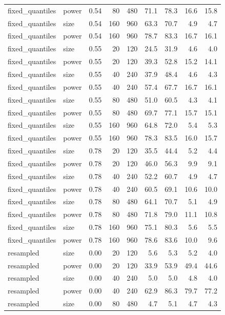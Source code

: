 \begin{table}[p]
\begin{tabular}{@{}llrrrrrrr@{}}
fixed\_quantiles & power & 0.54 & 80 & 480 & 71.1 & 78.3 & 16.6 & 15.8 \\
fixed\_quantiles & size & 0.54 & 160 & 960 & 63.3 & 70.7 & 4.9 & 4.7 \\
fixed\_quantiles & power & 0.54 & 160 & 960 & 78.7 & 83.3 & 16.7 & 16.1 \\
fixed\_quantiles & size & 0.55 & 20 & 120 & 24.5 & 31.9 & 4.6 & 4.0 \\
fixed\_quantiles & power & 0.55 & 20 & 120 & 39.3 & 52.8 & 15.2 & 14.1 \\
fixed\_quantiles & size & 0.55 & 40 & 240 & 37.9 & 48.4 & 4.6 & 4.3 \\
fixed\_quantiles & power & 0.55 & 40 & 240 & 57.4 & 67.7 & 16.7 & 16.1 \\
fixed\_quantiles & size & 0.55 & 80 & 480 & 51.0 & 60.5 & 4.3 & 4.1 \\
fixed\_quantiles & power & 0.55 & 80 & 480 & 69.7 & 77.1 & 15.7 & 15.1 \\
fixed\_quantiles & size & 0.55 & 160 & 960 & 64.8 & 72.0 & 5.4 & 5.3 \\
fixed\_quantiles & power & 0.55 & 160 & 960 & 78.3 & 83.5 & 16.0 & 15.7 \\
fixed\_quantiles & size & 0.78 & 20 & 120 & 35.5 & 44.4 & 5.2 & 4.4 \\
fixed\_quantiles & power & 0.78 & 20 & 120 & 46.0 & 56.3 & 9.9 & 9.1 \\
fixed\_quantiles & size & 0.78 & 40 & 240 & 52.2 & 60.7 & 4.9 & 4.7 \\
fixed\_quantiles & power & 0.78 & 40 & 240 & 60.5 & 69.1 & 10.6 & 10.0 \\
fixed\_quantiles & size & 0.78 & 80 & 480 & 64.1 & 70.7 & 5.1 & 4.9 \\
fixed\_quantiles & power & 0.78 & 80 & 480 & 71.8 & 79.0 & 11.1 & 10.8 \\
fixed\_quantiles & size & 0.78 & 160 & 960 & 75.1 & 80.3 & 5.6 & 5.5 \\
fixed\_quantiles & power & 0.78 & 160 & 960 & 78.6 & 83.6 & 10.0 & 9.6 \\
resampled & size & 0.00 & 20 & 120 & 5.6 & 5.3 & 5.2 & 4.0 \\
resampled & power & 0.00 & 20 & 120 & 33.9 & 53.9 & 49.4 & 44.6 \\
resampled & size & 0.00 & 40 & 240 & 5.0 & 5.0 & 4.8 & 4.0 \\
resampled & power & 0.00 & 40 & 240 & 62.9 & 86.3 & 79.7 & 77.2 \\
resampled & size & 0.00 & 80 & 480 & 4.7 & 5.1 & 4.7 & 4.3 \\

\end{tabular}
\end{table}
